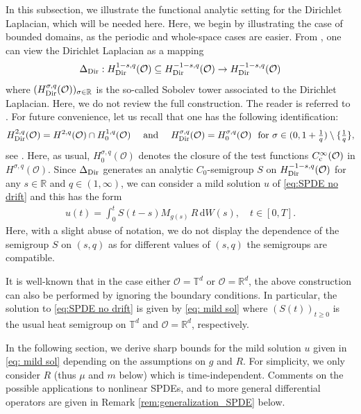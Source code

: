 \documentclass[reqno]{amsart}
\theoremstyle{plain}
\theoremstyle{remark}
\theoremstyle{plain}
\numberwithin{equation}{section}
\newcommand\cO{\mathcal{O}}
\def\R{{\mathbb R}}
\newcommand{\T}{\mathbb{T}}
\newcommand{\di}{\mathrm{d}}
\newcommand{\1}{\one}
\begin{document}
In this subsection, we illustrate the functional analytic setting for the Dirichlet Laplacian, which will be needed here. Here, we begin by illustrating the case of bounded domains, as the periodic and whole-space cases are easier.   
From  \cite[Example A.4]{AV25_survey}, one can view the Dirichlet  Laplacian as a mapping 
\begin{equation}
\label{eq:Delta_Dir_def}
\Delta_{\rm Dir}: H_{\rm Dir}^{1-s,q}(\cO)\subseteq H_{\rm Dir}^{-1-s,q}(\cO)\to H_{\rm Dir}^{-1-s,q}(\cO)
\end{equation}
where $(H_{\rm Dir}^{\sigma,q}(\cO))_{\sigma\in \R}$ is the so-called Sobolev tower associated to the Dirichlet Laplacian. Here, we do not review the full construction. The reader is referred to \cite[Appendix A]{AV25_survey}. For future convenience, let us recall that one has the following identification:
\begin{align}
\label{eq:basic_equality_Sob_tower_SPDEs}
H^{2,q}_{\rm Dir}(\cO) = 
H^{2,q}(\cO)
\cap 
H_0^{1,q}(\cO)
\quad \text{ and }\quad 
H^{\sigma,q}_{\rm Dir}(\cO) = 
H_0^{\sigma,q}(\cO) \ \text{ for }\sigma\in (0,1+\tfrac{1}{q})\setminus \{\tfrac{1}{q}\}, 
\end{align}
see \cite[eq.\ (A.3)]{AV25_survey}. Here, as usual, $H^{\sigma,q}_0(\cO)$ denotes the closure of the test functions $C^\infty_{{\rm c}}(\cO)$ in $H^{\sigma,q}(\cO)$.
Since $\Delta_{\rm Dir}$ generates an analytic $C_0$-semigroup $S$ on $H_{{\rm Dir}}^{-1-s,q}(\cO)$ for any $s\in\R$ and $q\in (1,\infty)$, we can consider a mild solution $u$ of \eqref{eq:SPDE no drift} and this has the form
\begin{align}
\label{eq: mild sol}
    u(t) = \int_0^t S(t-s) M_{g(s)}\, R \,\di W(s),\quad t\in [0,T].
\end{align}
Here, with a slight abuse of notation, we do not display the dependence of the semigroup $S$ on $(s,q)$ as for different values of $(s,q)$ the semigroups are compatible.

It is well-known that in the case either $\cO=\T^d$ or $\cO=\R^d$, the above construction can also be performed by ignoring the boundary conditions. In particular, the solution to \eqref{eq:SPDE no drift} is given by \eqref{eq: mild sol} where $(S(t))_{t\geq 0}$ is the usual heat semigroup on $\T^d$ and $\cO=\R^d$, respectively. 

\smallskip

In the following section, we derive sharp bounds for the mild solution $u$ given in \eqref{eq: mild sol} depending on the assumptions on $g$ and $R$. For simplicity, we only consider $R$ (thus $\mu$ and $m$ below) which is time-independent. Comments on the possible applications to nonlinear SPDEs, and to more general differential operators are given in Remark \ref{rem:generalization_SPDE} below. 
\end{document}
